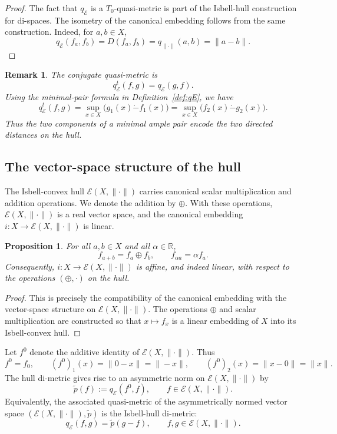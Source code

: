 \documentclass[preprint,12pt]{elsarticle}
\numberwithin{equation}{section}
\newtheorem{proposition}[theorem]{Proposition}
\newtheorem{remark}[theorem]{Remark}
\newcommand{\E}{\mathcal{E}}
\begin{document}
\begin{proof}
The fact that \(q_{\E}\) is a \(T_{0}\)-quasi-metric is part of the
Isbell-hull construction for di-spaces.  The isometry of the canonical
embedding follows from the same construction.  Indeed, for \(a,b\in X\),
\[
q_{\E}(f_a,f_b)=D(f_a,f_b)=q_{\|\cdot\|}(a,b)=\|a-b\|.
\]
\end{proof}

\begin{remark}\label{rem:qEconjugate}
The conjugate quasi-metric is
\[
q_{\E}^{t}(f,g)=q_{\E}(g,f).
\]
Using the minimal-pair formula in Definition~\ref{def:qE}, we have
\[
q_{\E}^{t}(f,g)
=
\sup_{x\in X}\bigl(g_1(x)\dot{-}f_1(x)\bigr)
=
\sup_{x\in X}\bigl(f_2(x)\dot{-}g_2(x)\bigr).
\]
Thus the two components of a minimal ample pair encode the two directed
distances on the hull.
\end{remark}

\subsection{The vector-space structure of the hull}

The Isbell-convex hull \(\E(X,\|\cdot\|)\) carries canonical scalar
multiplication and addition operations.  We denote the addition by \(\oplus\).
With these operations, \(\E(X,\|\cdot\|)\) is a real vector space, and the
canonical embedding \(i:X\to\E(X,\|\cdot\|)\) is linear.

\begin{proposition}\label{prop:compat}
For all \(a,b\in X\) and all \(\alpha\in\mathbb R\),
\[
f_{a+b}=f_a\oplus f_b,
\qquad
f_{\alpha a}=\alpha f_a.
\]
Consequently, \(i:X\to\E(X,\|\cdot\|)\) is affine, and indeed linear, with
respect to the operations \((\oplus,\cdot)\) on the hull.
\end{proposition}

\begin{proof}
This is precisely the compatibility of the canonical embedding with the
vector-space structure on \(\E(X,\|\cdot\|)\).  The operations \(\oplus\) and
scalar multiplication are constructed so that \(x\mapsto f_x\) is a linear
embedding of \(X\) into its Isbell-convex hull.
\end{proof}

Let \(f^0\) denote the additive identity of \(\E(X,\|\cdot\|)\).  Thus
\[
f^0=f_0,
\qquad
(f^0)_1(x)=\|0-x\|=\|-x\|,
\qquad
(f^0)_2(x)=\|x-0\|=\|x\|.
\]
The hull di-metric gives rise to an asymmetric norm on \(\E(X,\|\cdot\|)\) by
\[
\widetilde p(f):=q_{\E}(f^0,f),\qquad f\in\E(X,\|\cdot\|).
\]
Equivalently, the associated quasi-metric of the asymmetrically normed vector
space \((\E(X,\|\cdot\|),\widetilde p)\) is the Isbell-hull di-metric:
\[
q_{\E}(f,g)=\widetilde p(g-f),
\qquad f,g\in\E(X,\|\cdot\|).
\]
\end{document}
